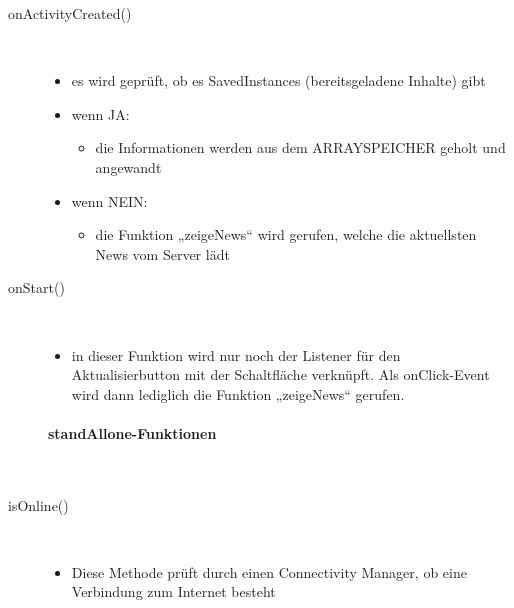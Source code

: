 \begin{description}
\item[onActivityCreated()]~\par
\begin{itemize}
\item es wird geprüft, ob es SavedInstances (bereitsgeladene Inhalte) gibt
\item wenn JA:
\begin{itemize}
\item die Informationen werden aus dem ARRAYSPEICHER geholt und angewandt
\end{itemize}
\item wenn NEIN:
\begin{itemize}
\item die Funktion „zeigeNews“ wird gerufen, welche die aktuellsten News vom Server lädt
\end{itemize}
\end{itemize}

 
\item[onStart()]~\par
\begin{itemize}
\item in dieser Funktion wird nur noch der Listener für den Aktualisierbutton mit der Schaltfläche verknüpft. Als onClick-Event wird dann lediglich die Funktion „zeigeNews“ gerufen.
\end{itemize}

 
\paragraph{standAllone-Funktionen}
\  \\[1em]
\item[isOnline()]~\par
\begin{itemize}
\item Diese Methode prüft durch einen Connectivity Manager, ob eine Verbindung zum Internet besteht
\end{itemize}


\end{description}
